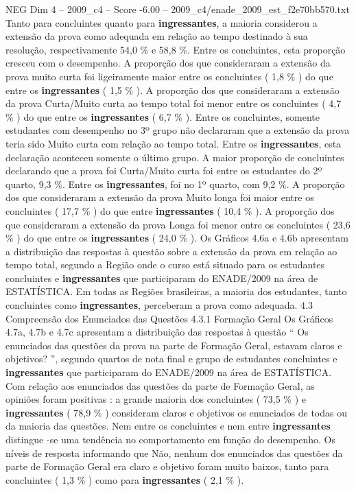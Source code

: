 \begin{textsample}{NEG Dim 4 – 2009\_c4 – Score -6.00 – 2009\_c4/enade\_2009\_est\_f2e70bb570.txt}
Tanto para concluintes quanto para \textbf{ingressantes}, a maioria considerou a extensão da prova como adequada em relação ao tempo destinado à sua resolução, respectivamente 54,0 \% e 58,8 \%.
Entre os concluintes, esta proporção cresceu com o desempenho.
A proporção dos que consideraram a extensão da prova muito curta foi ligeiramente maior entre os concluintes ( 1,8 \% ) do que entre os \textbf{ingressantes} ( 1,5 \% ).
A proporção dos que consideraram a extensão da prova Curta/Muito curta ao tempo total foi menor entre os concluintes ( 4,7 \% ) do que entre os \textbf{ingressantes} ( 6,7 \% ).
Entre os concluintes, somente estudantes com desempenho no 3º grupo não declararam que a extensão da prova teria sido Muito curta com relação ao tempo total.
Entre os \textbf{ingressantes}, esta declaração aconteceu somente o último grupo.
A maior proporção de concluintes declarando que a prova foi Curta/Muito curta foi entre os estudantes do 2º quarto, 9,3 \%.
Entre os \textbf{ingressantes}, foi no 1º quarto, com 9,2 \%.
A proporção dos que consideraram a extensão da prova Muito longa foi maior entre os concluintes ( 17,7 \% ) do que entre \textbf{ingressantes} ( 10,4 \% ).
A proporção dos que consideraram a extensão da prova Longa foi menor entre os concluintes ( 23,6 \% ) do que entre os \textbf{ingressantes} ( 24,0 \% ).
Os Gráficos 4.6a e 4.6b apresentam a distribuição das respostas à questão sobre a extensão da prova em relação ao tempo total, segundo a Região onde o curso está situado para os estudantes concluintes e \textbf{ingressantes} que participaram do ENADE/2009 na área de ESTATÍSTICA.
Em todas as Regiões brasileiras, a maioria dos estudantes, tanto concluintes como \textbf{ingressantes}, perceberam a prova como adequada. 4.3 Compreensão dos Enunciados das Questões 4.3.1 Formação Geral Os Gráficos 4.7a, 4.7b e 4.7c apresentam a distribuição das respostas à questão “ Os enunciados das questões da prova na parte de Formação Geral, estavam claros e objetivos? ”, segundo quartos de nota final e grupo de estudantes concluintes e \textbf{ingressantes} que participaram do ENADE/2009 na área de ESTATÍSTICA.
Com relação aos enunciados das questões da parte de Formação Geral, as opiniões foram positivas : a grande maioria dos concluintes ( 73,5 \% ) e \textbf{ingressantes} ( 78,9 \% ) consideram claros e objetivos os enunciados de todas ou da maioria das questões.
Nem entre os concluintes e nem entre \textbf{ingressantes} distingue -se uma tendência no comportamento em função do desempenho.
Os níveis de resposta informando que Não, nenhum dos enunciados das questões da parte de Formação Geral era claro e objetivo foram muito baixos, tanto para concluintes ( 1,3 \% ) como para \textbf{ingressantes} ( 2,1 \% ).

\end{textsample}
